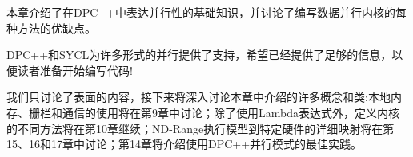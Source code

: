 本章介绍了在DPC++中表达并行性的基础知识，并讨论了编写数据并行内核的每种方法的优缺点。\par

DPC++和SYCL为许多形式的并行提供了支持，希望已经提供了足够的信息，以便读者准备开始编写代码!\par

我们只讨论了表面的内容，接下来将深入讨论本章中介绍的许多概念和类:本地内存、栅栏和通信的使用将在第9章中讨论；除了使用Lambda表达式外，定义内核的不同方法将在第10章继续；ND-Range执行模型到特定硬件的详细映射将在第15、16和17章中讨论；第14章将介绍使用DPC++并行模式的最佳实践。\par

\newpage